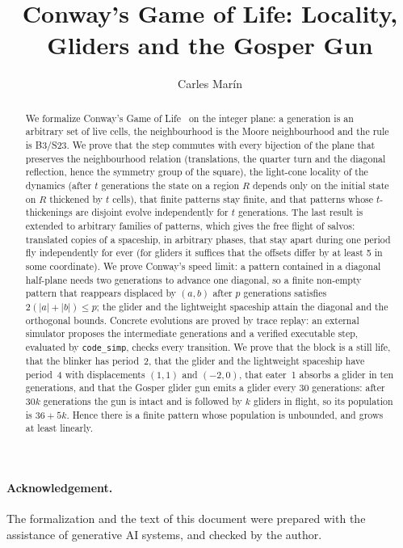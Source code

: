 \documentclass[10pt,a4paper]{article}
\begin{document}
\title{Conway's Game of Life: Locality, Gliders and the Gosper Gun}
\author{Carles Mar\'in}
\maketitle

\begin{abstract}
We formalize Conway's Game of Life~\cite{Gardner70,BCG82} on the integer plane: a generation is an arbitrary set
of live cells, the neighbourhood is the Moore neighbourhood and the rule is B3/S23. We prove that the step commutes
with every bijection of the plane that preserves the neighbourhood relation (translations, the quarter turn and the
diagonal reflection, hence the symmetry group of the square), the light-cone locality of the dynamics (after $t$
generations the state on a region $R$ depends only on the initial state on $R$ thickened by $t$ cells), that finite
patterns stay finite, and that patterns whose $t$-thickenings are disjoint evolve independently for $t$ generations.
The last result is extended to arbitrary families of patterns, which gives the free flight of salvos: translated
copies of a spaceship, in arbitrary phases, that stay apart during one period fly independently for ever (for
gliders it suffices that the offsets differ by at least 5 in some coordinate). We prove Conway's speed limit: a
pattern contained in a diagonal half-plane needs two generations to advance one diagonal, so a finite non-empty
pattern that reappears displaced by $(a,b)$ after $p$ generations satisfies $2(|a|+|b|)\le p$; the glider and the
lightweight spaceship attain the diagonal and the orthogonal bounds.
Concrete evolutions are proved by trace replay: an external simulator proposes the intermediate generations and a
verified executable step, evaluated by \texttt{code\_simp}, checks every transition. We prove that the block is a
still life, that the blinker has period~2, that the glider and the lightweight spaceship have period~4 with
displacements $(1,1)$ and $(-2,0)$, that eater~1 absorbs a glider in ten generations, and that the Gosper glider gun
emits a glider every 30 generations: after $30k$ generations the gun is intact and is followed by $k$ gliders in
flight, so its population is $36+5k$. Hence there is a finite pattern whose population is unbounded, and grows at
least linearly.
\end{abstract}

\paragraph{Acknowledgement.} The formalization and the text of this document were prepared with the
assistance of generative AI systems, and checked by the author.
\end{document}
